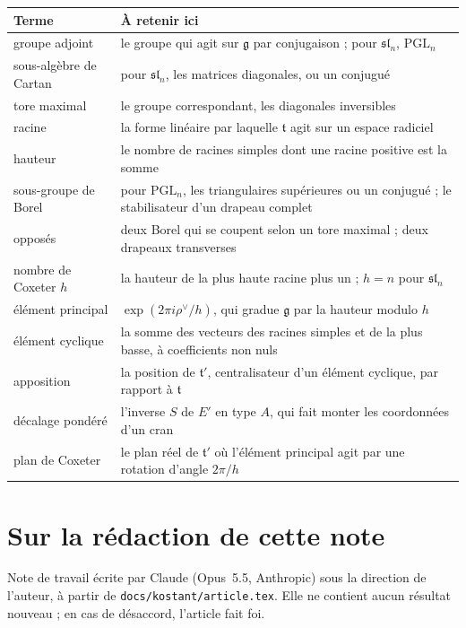 \documentclass[11pt,a4paper]{amsart}
\theoremstyle{definition}
\theoremstyle{plain}
\theoremstyle{remark}
\newcommand{\g}{\mathfrak g}
\newcommand{\tl}{\mathfrak t}
\newcommand{\PGL}{\mathrm{PGL}}
\begin{document}
\begin{tabular}{@{}p{3.8cm}p{10cm}@{}}
\toprule
Terme & À retenir ici \\
\midrule
groupe adjoint & le groupe qui agit sur $\g$ par conjugaison ; pour $\mathfrak{sl}_n$, $\PGL_n$ \\[2pt]
sous-algèbre de Cartan & pour $\mathfrak{sl}_n$, les matrices diagonales, ou un conjugué \\
tore maximal & le groupe correspondant, les diagonales inversibles \\
racine & la forme linéaire par laquelle $\tl$ agit sur un espace radiciel \\
hauteur & le nombre de racines simples dont une racine positive est la somme \\[2pt]
sous-groupe de Borel & pour $\PGL_n$, les triangulaires supérieures ou un conjugué ; le stabilisateur d'un drapeau complet \\[2pt]
opposés & deux Borel qui se coupent selon un tore maximal ; deux drapeaux transverses \\[2pt]
nombre de Coxeter $h$ & la hauteur de la plus haute racine plus un ; $h = n$ pour $\mathfrak{sl}_n$ \\[2pt]
élément principal & $\exp(2\pi i\rho^\vee/h)$, qui gradue $\g$ par la hauteur modulo $h$ \\[2pt]
élément cyclique & la somme des vecteurs des racines simples et de la plus basse, à coefficients non nuls \\[2pt]
apposition & la position de $\tl'$, centralisateur d'un élément cyclique, par rapport à $\tl$ \\[2pt]
décalage pondéré & l'inverse $S$ de $E'$ en type $A$, qui fait monter les coordonnées d'un cran \\[2pt]
plan de Coxeter & le plan réel de $\tl'$ où l'élément principal agit par une rotation d'angle $2\pi/h$ \\
\bottomrule
\end{tabular}

\section*{Sur la rédaction de cette note}

Note de travail écrite par Claude (Opus~5.5, Anthropic) sous la direction de l'auteur, à partir de \texttt{docs/kostant/article.tex}. Elle ne contient aucun résultat nouveau ; en cas de désaccord, l'article fait foi.
\end{document}
